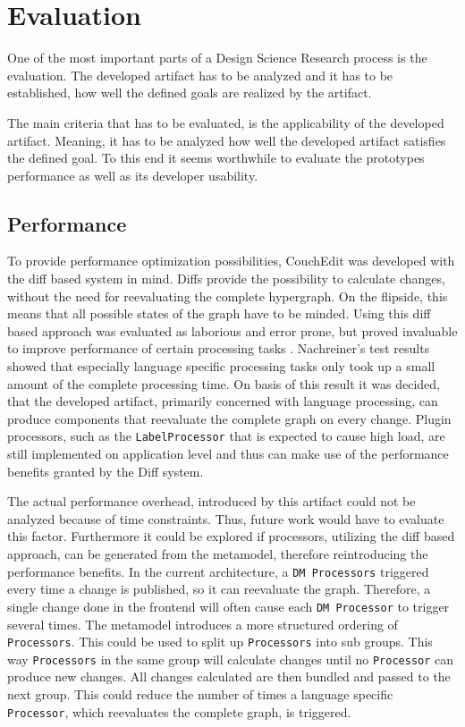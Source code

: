 \chapter{Evaluation}
\label{chap:evaluation}
One of the most important parts of a Design Science Research process is the evaluation. The developed artifact has to be analyzed and it has to be established, how well the defined goals are realized by the artifact.

The main criteria that has to be evaluated, is the applicability of the developed artifact. Meaning, it has to be analyzed how well the developed artifact satisfies the defined goal. To this end it seems worthwhile to evaluate the prototypes performance as well as its developer usability. 

\section{Performance}
To provide performance optimization possibilities, CouchEdit was developed with the diff based system in mind. Diffs provide the possibility to calculate changes, without the need for reevaluating the complete hypergraph. On the flipside, this means that all possible states of the graph have to be minded. Using this diff based approach was evaluated as laborious and error prone, but proved invaluable to improve performance of certain processing tasks \cite{nachreiner_couchedit_2020}. Nachreiner's test results showed that especially language specific processing tasks only took up a small amount of the complete processing time. On basis of this result it was decided, that the developed artifact, primarily concerned with language processing, can produce components that reevaluate the complete graph on every change. Plugin processors, such as the \texttt{LabelProcessor} that is expected to cause high load, are still implemented on application level and thus can make use of the performance benefits granted by the Diff system. 

The actual performance overhead, introduced by this artifact could not be analyzed because of time constraints. Thus, future work would have to evaluate this factor. Furthermore it could be explored if processors, utilizing the diff based approach, can be generated from the metamodel, therefore reintroducing the performance benefits. In the current architecture, a \texttt{DM Processors} triggered every time a change is published, so it can reevaluate the graph. Therefore, a single change done in the frontend will often cause each \texttt{DM Processor} to trigger several times. The metamodel introduces a more structured ordering of \texttt{Processors}. This could be used to split up \texttt{Processors} into sub groups. This way \texttt{Processors} in the same group will calculate changes until no \texttt{Processor} can produce new changes. All changes calculated are then bundled and passed to the next group. This could reduce the number of times a language specific \texttt{Processor}, which reevaluates the complete graph, is triggered.  

